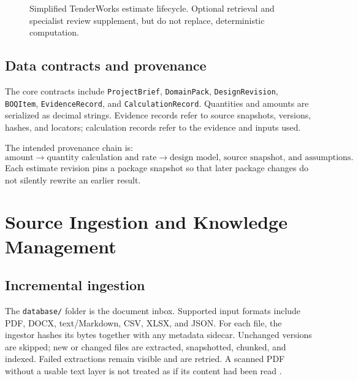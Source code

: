 \begin{figure}[htbp]
\centering
{}
\caption{Simplified TenderWorks estimate lifecycle. Optional retrieval and specialist review supplement, but do not replace, deterministic computation.}
\label{fig:workflow}
\end{figure}

\subsection{Data contracts and provenance}
The core contracts include \texttt{ProjectBrief}, \texttt{DomainPack}, \texttt{DesignRevision}, \texttt{BOQItem}, \texttt{EvidenceRecord}, and \texttt{CalculationRecord}. Quantities and amounts are serialized as decimal strings. Evidence records refer to source snapshots, versions, hashes, and locators; calculation records refer to the evidence and inputs used.

The intended provenance chain is:
\[
\text{amount} \longrightarrow \text{quantity calculation and rate}
\longrightarrow \text{design model, source snapshot, and assumptions}.
\]
Each estimate revision pins a package snapshot so that later package changes do not silently rewrite an earlier result.

\section{Source Ingestion and Knowledge Management}
\subsection{Incremental ingestion}
The \texttt{database/} folder is the document inbox. Supported input formats include PDF, DOCX, text/Markdown, CSV, XLSX, and JSON. For each file, the ingestor hashes its bytes together with any metadata sidecar. Unchanged versions are skipped; new or changed files are extracted, snapshotted, chunked, and indexed. Failed extractions remain visible and are retried. A scanned PDF without a usable text layer is not treated as if its content had been read \cite{tenderworks2026}.

